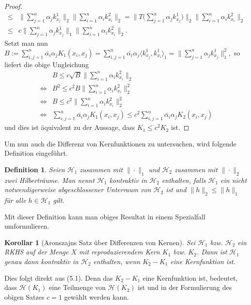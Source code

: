 \documentclass[12pt,titlepage,twoside,cleardoublepage]{article}
\theoremstyle{nummermitklammern}
\newtheorem{korollar}[temp]{Korollar}
\newtheorem{definition}[temp]{Definition}
\newtheorem{definition}[zahl]{Definition}
\numberwithin{equation}{section}
\newtheorem{korollar}[zahl]{Korollar}
\begin{document}
\begin{proof}
\begin{align*}
\leq&\|\sum_{j=1}^n \alpha_j k^1_{x_j}\|_2\|\sum_{i=1}^n\alpha_ik^2_{x_i}\|_2
=\|T\biggl({\sum_{j=1}^n \alpha_j k^1_{x_j}}\biggr)\|_2\|\sum_{i=1}^n\alpha_ik^2_{x_i}\|_2\\
\leq& c\|\sum_{j=1}^n \alpha_j k^1_{x_j}\|_1\|\sum_{i=1}^n\alpha_ik^2_{x_i}\|_2.
\end{align*}
Setzt man nun $B:=\sum^n_{i,j=1}\bar{\alpha_i}\alpha_jK_1(x_i,x_j)=\sum^n_{i,j=1}\bar{\alpha_i}\alpha_j\langle k^1_{x_j},k^1_{x_i}\rangle_1=\|\sum^n_{j=1}\alpha_jk^1_{x_j}\|^2_1,$ so liefert die obige Ungleichung
\begin{align*}
&B\leq c \sqrt{B}\|\sum_{i=1}^n\alpha_ik^2_{x_i}\|_2\\
\iff &B^2\leq c^2B\|\sum_{i=1}^n\alpha_ik^2_{x_i}\|_2^2\\
\iff &B\leq c^2 \|\sum_{i=1}^n\alpha_ik^2_{x_i}\|_2^2\\
\iff &\sum^n_{i,j=1}\bar{\alpha_i}\alpha_jK_1(x_i,x_j) \leq c^2 \sum^n_{i,j=1}\bar{\alpha_i}\alpha_jK_2(x_i,x_j)
\end{align*} 
und dies ist äquivalent zu der Aussage, dass $K_1\leq c^2K_2$ ist.
\end{proof}
Um nun auch die Differenz von Kernfunktionen zu untersuchen, wird folgende Definition eingeführt.
\begin{definition}
Seien $\mathcal{H}_1$ zusammen mit $\|\cdot\|_1$ und $\mathcal{H}_2$ zusammen mit $\| \cdot\|_2$ zwei Hilberträume. Man nennt $\mathcal{H}_1$ \emph{kontraktiv} in $\mathcal{H}_2$  enthalten, falls $\mathcal{H}_1$ ein nicht notwendigerweise abgeschlossener Unterraum von $\mathcal{H}_2$ ist und $\|h\|_2 \leq \|h\|_1$ für alle $h \in \mathcal{H}_1$ gilt.
\end{definition}
Mit dieser Definition kann man obiges Resultat in einem Spezialfall umformulieren. 
\begin{korollar}[Aronszajns Satz über Differenzen von Kernen] 
Sei $\mathcal{H}_1$ bzw. $\mathcal{H}_2$ ein RKHS auf der Menge $X$ mit reproduzierendem Kern $K_1$ bzw. $K_2$. Dann ist $\mathcal{H}_1$ genau dann kontraktiv in $\mathcal{H}_2$ enthalten, wenn $K_2-K_1$ eine Kernfunktion ist.
\end{korollar}
Dies folgt direkt aus (5.1). Denn das $K_2-K_1$ eine Kernfunktion ist,  bedeutet, dass  $\mathcal{H}(K_1)$ eine Teilmenge von $\mathcal{H}(K_2)$ ist und in der Formulierung des obigen Satzes $c=1$ gewählt werden kann.
\end{document}

